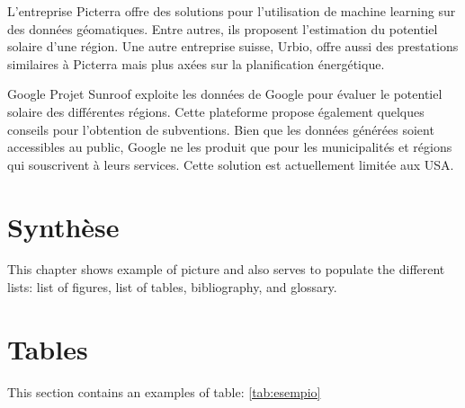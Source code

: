 {{{\par{L'entreprise Picterra \cite{picterra_infrastructure_nodate} offre des solutions pour l'utilisation de machine learning sur des données géomatiques. Entre autres, ils proposent l'estimation du potentiel solaire d'une région. Une autre entreprise suisse, Urbio, \cite{urbio_urbio_nodate} offre aussi des prestations similaires à Picterra mais plus axées sur la planification énergétique.}

\par{Google Projet Sunroof \cite{google_project_nodate} exploite les données de Google pour évaluer le potentiel solaire des différentes régions. Cette plateforme propose également quelques conseils pour l'obtention de subventions. Bien que les données générées soient accessibles au public, Google ne les produit que pour les municipalités et régions qui souscrivent à leurs services. Cette solution est actuellement limitée aux USA.}

\section{Synthèse}































\newpage

This chapter shows example of picture and also serves to populate the different lists: list of figures, list of tables, bibliography, and glossary.

\section{Tables}

This section contains an examples of table: \autoref{tab:esempio}

}}}
